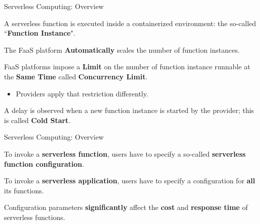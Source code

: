 \documentclass[13.5pt]{beamer}
\newcommand{\B}[1]{\textcolor{TorVergataColor}{\textbf{#1}}}
\begin{document}
\begin{frame}{Serverless Computing: Overview}
	
	\begin{block}{}
		\centering
		A serverless function is executed inside a containerized environment: the so-called ``\B{Function Instance}".
	\end{block}

	\vspace{\baselineskip}
	
	\begin{block}{}
		\centering
		The FaaS platform \B{Automatically} scales the number of function instances.
	\end{block}

	\vspace{\baselineskip}
	
	\begin{block}{}
		FaaS platforms impose a \B{Limit} on the number of function instance runnable at the \B{Same Time} called \B{Concurrency Limit}.
		\begin{itemize}
			\item Providers apply that restriction differently.
		\end{itemize}
	\end{block}

\vspace{\baselineskip}

\begin{block}{}
	A delay is observed when a new function instance is started by the provider; this is called \B{Cold Start}.
\end{block}
		
\end{frame} 
\begin{frame}{Serverless Computing: Overview}
	
	\begin{block}{}
		\centering
		To invoke a \B{serverless function}, users have to specify a so-called \B{serverless function configuration}.
	\end{block}
	\vspace{\baselineskip}
	\begin{block}{}
		\centering
		To invoke a \B{serverless application}, users have to specify a configuration for \B{all} its functions.
	\end{block}
	\vspace{\baselineskip}
	\begin{block}{}
		\centering
		Configuration parameters \B{significantly} affect the \B{cost} and \B{response time} of serverless functions.
	\end{block}
	
	
\end{frame} 
\end{document}

